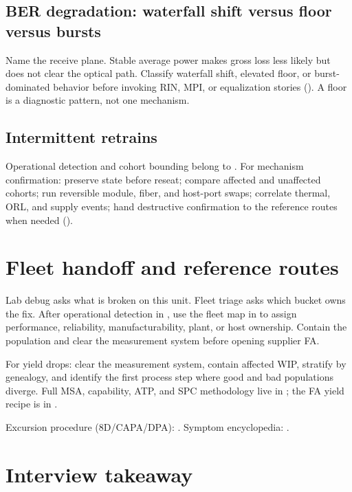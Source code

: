 \subsection{BER degradation: waterfall shift versus floor versus bursts}

Name the receive plane. Stable average power makes gross loss less likely but
does not clear the optical path. Classify waterfall shift, elevated floor, or
burst-dominated behavior before invoking RIN, MPI, or equalization stories
(). A floor is a diagnostic
pattern, not one mechanism.

\subsection{Intermittent retrains}

Operational detection and cohort bounding belong to . For
mechanism confirmation: preserve state before reseat; compare affected and
unaffected cohorts; run reversible module, fiber, and host-port swaps; correlate
thermal, ORL, and supply events; hand destructive confirmation to the reference
routes when needed ().

\section{Fleet handoff and reference routes}
\label{sec:fleet-triage}

Lab debug asks what is broken on this unit. Fleet triage asks which bucket owns
the fix. After operational detection in , use the fleet map
in  to assign performance,
reliability, manufacturability, plant, or host ownership. Contain the population
and clear the measurement system before opening supplier FA.

For yield drops: clear the measurement system, contain affected WIP, stratify by
genealogy, and identify the first process step where good and bad populations
diverge. Full MSA, capability, ATP, and SPC methodology live in
; the FA yield recipe is in .

Excursion procedure (8D/CAPA/DPA): . Symptom encyclopedia:
.

\section{Interview takeaway}
\label{sec:failure-analysis-design-review}


